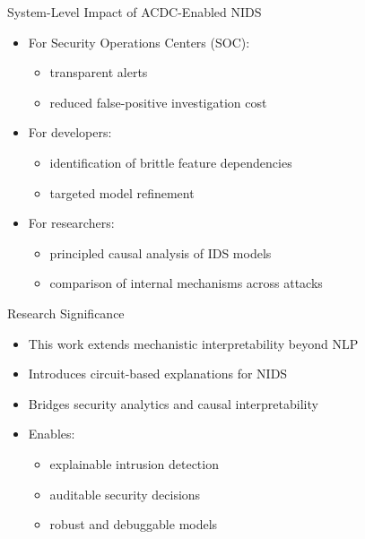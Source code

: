 \documentclass{beamer}
\begin{document}
	\begin{frame}{System-Level Impact of ACDC-Enabled NIDS}
		\begin{itemize}
			\item For Security Operations Centers (SOC):
			\begin{itemize}
				\item transparent alerts
				\item reduced false-positive investigation cost
			\end{itemize}
			\item For developers:
			\begin{itemize}
				\item identification of brittle feature dependencies
				\item targeted model refinement
			\end{itemize}
			\item For researchers:
			\begin{itemize}
				\item principled causal analysis of IDS models
				\item comparison of internal mechanisms across attacks
			\end{itemize}
		\end{itemize}
	\end{frame}
	
	\begin{frame}{Research Significance}
		\begin{itemize}
			\item This work extends mechanistic interpretability beyond NLP
			\item Introduces circuit-based explanations for NIDS
			\item Bridges security analytics and causal interpretability
			\item Enables:
			\begin{itemize}
				\item explainable intrusion detection
				\item auditable security decisions
				\item robust and debuggable models
			\end{itemize}
		\end{itemize}
	\end{frame}
	
\end{document}
